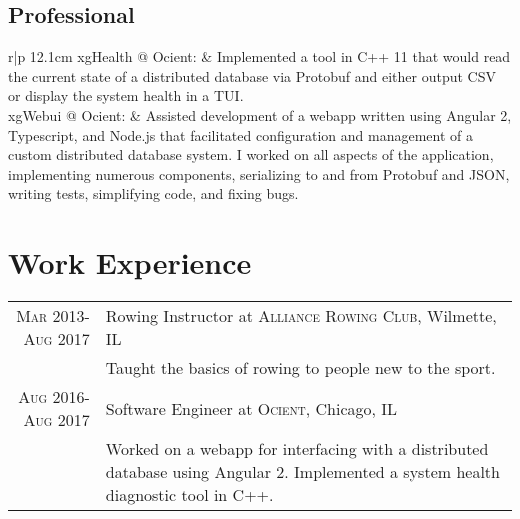 \documentclass[a4paper,10pt]{article} %
\begin{document}
\subsection{Professional}
\begin{tabular}{r|p {12.1cm}}
    xgHealth @ Ocient: & Implemented a tool in C++ 11 that would read the current state of a distributed database via Protobuf and either output CSV or display the system health in a TUI.\\ 
    xgWebui @ Ocient: & Assisted development of a webapp written using Angular 2, Typescript, and Node.js that facilitated configuration and management of a custom distributed database system. I worked on all aspects of the application, implementing numerous components, serializing to and from Protobuf and JSON, writing tests, simplifying code, and fixing bugs.


\end{tabular}

\section{Work Experience}

\begin{tabular}{r|p{11cm}}

\textsc{Mar 2013-Aug 2017} & Rowing Instructor at \textsc{Alliance Rowing Club}, Wilmette, IL \emph{}\\
& \footnotesize{Taught the basics of rowing to people new to the sport.} \\

\textsc{Aug 2016-Aug 2017} & Software Engineer at \textsc{Ocient}, Chicago, IL \emph{} \\
& \footnotesize{Worked on a webapp for interfacing with a distributed database using Angular 2. Implemented a system health diagnostic tool in C++. }
\end{tabular}






\end{document}
